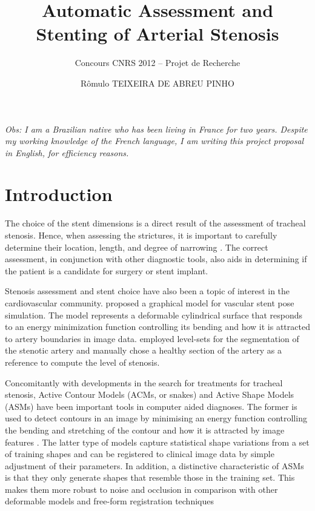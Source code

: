 \documentclass{article}
\title{Automatic Assessment and Stenting of Arterial Stenosis}
\author{Concours CNRS 2012 -- Projet de Recherche}
\date{R\^omulo TEIXEIRA DE ABREU PINHO}
\begin{document}
\maketitle

\begin{flushleft}
{\em Obs: I am a Brazilian native who has been living in France for two years. Despite my working knowledge of the French language, I am writing this project proposal in English, for efficiency reasons.}
\end{flushleft}

\begin{abstract}

\end{abstract}

\tableofcontents

\section{Introduction}

The choice of the stent dimensions is a direct result of the assessment of tracheal stenosis. Hence, when assessing the strictures, it is important to carefully determine their location, length, and degree of narrowing \citep{Boiselle}. The correct assessment, in conjunction with other diagnostic
tools, also aids in determining if the patient is a candidate for surgery or stent implant.

Stenosis assessment and stent choice have also been a topic of interest in the cardiovascular community. \citet{Florez} proposed a graphical model for vascular stent pose simulation. The model represents a deformable cylindrical surface that responds to an energy minimization function controlling its bending and how it is attracted to artery boundaries in image data. \citet{Bemmel} employed level-sets for the segmentation of the stenotic artery and manually chose a healthy section
of the artery as a reference to compute the level of stenosis.

Concomitantly with developments in the search for treatments for tracheal stenosis, Active Contour Models (ACMs, or snakes) and Active Shape Models (ASMs) have been important tools in computer aided diagnoses. The former is used to detect contours in an image by minimising an energy function controlling the bending and stretching of the contour and how it is attracted by image features \citep{Kass}. The latter type of models capture statistical shape variations from a set of training shapes and can be registered to clinical image data by simple adjustment of their parameters.
In addition, a distinctive characteristic of ASMs is that they only generate shapes that resemble those in the training set. This makes them more robust to noise and occlusion in comparison with other deformable models and free-form registration techniques \citep{Cootes}
\end{document}
